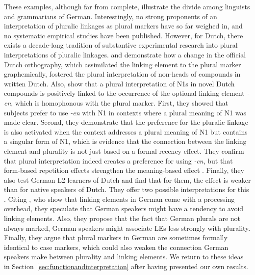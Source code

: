 These examples, although far from complete, illustrate the divide among linguists and grammarians of German.
Interestingly, no strong proponents of an interpretation of pluralic linkages as plural markers have so far weighed in, and no systematic empirical studies have been published.
However, for Dutch, there exists a decade-long tradition of substantive experimental research into plural interpretations of pluralic linkages.
\textcite{SchreuderEa1998} and \textcite{BangaEa2012} demonstrate how a change in the official Dutch orthography, which assimilated the linking element to the plural marker graphemically, fostered the plural interpretation of non-heads of compounds in written Dutch.
Also, \textcite{BangaEa2013a} show that a plural interpretation of N1s in novel Dutch compounds is positively linked to the occurrence of the optional linking element \textit{-en}, which is homophonous with the plural marker.
First, they showed that subjects prefer to use \textit{-en} with N1 in contexts where a plural meaning of N1 was made clear.
Second, they demonstrate that the preference for the pluralic linkage is also activated when the context addresses a plural meaning of N1 but contains a singular form of N1, which is evidence that the connection between the linking element and plurality is not just based on a formal recency effect.
They confirm that plural interpretation indeed creates a preference for using \textit{-en}, but that form-based repetition effects strengthen the meaning-based effect \parencite[45]{BangaEa2013a}.
Finally, they also test German L2 learners of Dutch and find that for them, the effect is weaker than for native speakers of Dutch.
They offer two possible interpretations for this \parencite[45--47]{BangaEa2013a}.
Citing \textcite{LibbenEa2002}, who show that linking elements in German come with a processing overhead, they speculate that German speakers might have a tendency to avoid linking elements.
Also, they propose that the fact that German plurals are not always marked, German speakers might associate LEs less strongly with plurality.
Finally, they argue that plural markers in German are sometimes formally identical to case markers, which could also weaken the connection German speakers make between plurality and linking elements.
We return to these ideas in Section~\ref{sec:functionandinterpretation} after having presented our own results.

